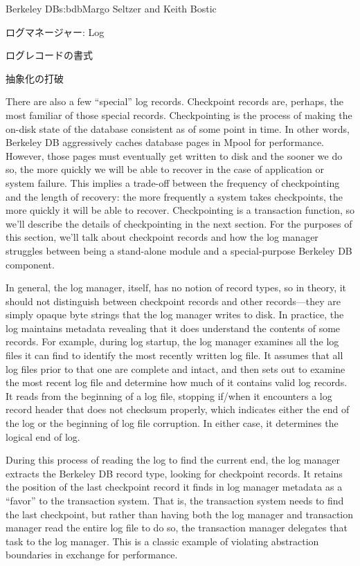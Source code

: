\begin{aosachapter}{Berkeley DB}{s:bdb}{Margo Seltzer and Keith Bostic}
\begin{aosasect1}{ログマネージャー: Log}
\begin{aosasect2}{ログレコードの書式}
\end{aosasect2}

\begin{aosasect2}{抽象化の打破}

There are also a few ``special'' log records.  Checkpoint records are,
perhaps, the most familiar of those special records. Checkpointing is
the process of making the on-disk state of the database consistent as
of some point in time. In other words, Berkeley DB aggressively caches
database pages in Mpool for performance. However, those pages must
eventually get written to disk and the sooner we do so, the more
quickly we will be able to recover in the case of application or
system failure. This implies a trade-off between the frequency of
checkpointing and the length of recovery: the more frequently a system
takes checkpoints, the more quickly it will be able to
recover. Checkpointing is a transaction function, so we'll describe
the details of checkpointing in the next section.  For the purposes of
this section, we'll talk about checkpoint records and how the log
manager struggles between being a stand-alone module and a
special-purpose Berkeley DB component.

In general, the log manager, itself, has no notion of record types, so
in theory, it should not distinguish between checkpoint records and
other records---they are simply opaque byte strings that the log
manager writes to disk. In practice, the log maintains metadata
revealing that it does understand the contents of some records. For
example, during log startup, the log manager examines all the log
files it can find to identify the most recently written log file. It
assumes that all log files prior to that one are complete and intact,
and then sets out to examine the most recent log file and determine
how much of it contains valid log records. It reads from the beginning
of a log file, stopping if/when it encounters a log record header that
does not checksum properly, which indicates either the end of the log
or the beginning of log file corruption. In either case, it determines
the logical end of log.

During this process of reading the log to find the current end, the
log manager extracts the Berkeley DB record type, looking for
checkpoint records. It retains the position of the last checkpoint
record it finds in log manager metadata as a ``favor'' to the
transaction system. That is, the transaction system needs to find the
last checkpoint, but rather than having both the log manager and
transaction manager read the entire log file to do so, the transaction
manager delegates that task to the log manager. This is a classic
example of violating abstraction boundaries in exchange for
performance.


\end{aosasect2}
\end{aosasect1}
\end{aosachapter}
